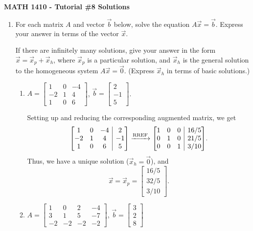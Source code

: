 \documentclass[12pt]{article}
\makeatletter
\newenvironment{amatrix}[1]{%
  \left[\begin{array}{@{}*{#1}{c}|c@{}}
}{%
  \end{array}\right]
}
\newcommand{\bbm}{\begin{bmatrix}}
\newcommand{\ebm}{\end{bmatrix}}
\newcommand{\bam}{\begin{amatrix}}
\newcommand{\eam}{\end{amatrix}}
\makeatother
\begin{document}
\author{Instructor: Sean Fitzpatrick}
\thispagestyle{empty}
\begin{center}
{\bf MATH 1410 - Tutorial \#8 Solutions}
\end{center}

 \begin{enumerate}
\item For each matrix $A$ and vector $\vec{b}$ below, solve the equation $A\vec{x}=\vec{b}$. Express your answer in terms of the vector $\vec{x}$.

If there are infinitely many solutions, give your answer in the form $\vec{x}=\vec{x}_p+\vec{x}_h$, where $\vec{x}_p$ is a particular solution, and $\vec{x}_h$ is the general solution to the homogeneous system $A\vec{x}=\vec{0}$. (Express $\vec{x}_h$ in terms of basic solutions.)
\begin{enumerate}
\item $A = \bbm 1&0&-4\\-2&1&4\\1&0&6\ebm$, $\vec{b}=\bbm 2\\-1\\5\ebm$.

Setting up and reducing the corresponding augmented matrix, we get
\[
\bam{3}1&0&-4&2\\-2&1&4&-1\\1&0&6&5\eam \xrightarrow{\text{RREF}} \bam{3}1&0&0&16/5\\0&1&0&21/5\\0&0&1&3/10\eam.
\]
Thus, we have a unique solution ($\vec{x}_h=\vec{0}$), and
\[
\vec{x}=\vec{x}_p = \bbm 16/5\\32/5\\3/10\ebm.
\]

\item $A= \bbm 1&0&2&-4\\3&1&5&-7\\-2&-2&-2&-2\ebm$, $\vec{b}=\bbm 3\\2\\8\ebm$


\end{enumerate}
\end{enumerate}
\end{document}

